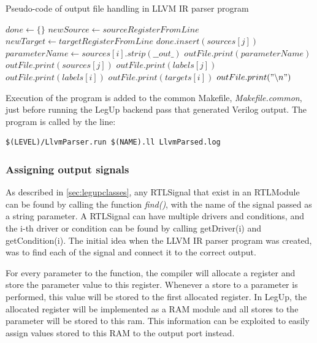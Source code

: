 \begin{algorithm}
  \caption{Pseudo-code of output file handling in LLVM IR parser program
  \label{alg:llvmparserpart2}}
  \begin{algorithmic}[1]
    \State $done \leftarrow \{\}$
            \State $newSource \leftarrow sourceRegisterFromLine$
            \State $newTarget \leftarrow targetRegisterFromLine$
            \State $done.insert(sources[j])$
              \State $parameterName \leftarrow sources[i].strip(\_\_out\_)$
              \State $outFile.print(parameterName)$
              \State $outFile.print(sources[j])$
              \State $outFile.print(labels[j])$
              \State $outFile.print(labels[i])$
              \State $outFile.print(targets[i])$
              \State $outFile.print("\backslash n")$ 
            \EndIf
          \EndIf
        \EndFor
      \EndFor
    \EndIf
  \end{algorithmic}
\end{algorithm}
Execution of the program is added to the common Makefile, \textit{Makefile.common}, just before running the LegUp backend pass that generated Verilog output. The program is called by the line:
\begin{verbatim}
$(LEVEL)/LlvmParser.run $(NAME).ll LlvmParsed.log
\end{verbatim}

\subsubsection{\label{subsec:assigningoutputsignals}Assigning output signals}
As described in \cref{sec:legupclasses}, any RTLSignal that exist in an RTLModule can be found by calling the function \textit{find()}, with the name of the signal passed as a string parameter. A RTLSignal can have multiple drivers and conditions, and the i-th driver or condition can be found by calling getDriver(i) and getCondition(i). The initial idea when the LLVM IR parser program was created, was to find each of the signal and connect it to the correct output.

For every parameter to the function, the compiler will allocate a register and store the parameter value to this register. Whenever a store to a parameter is performed, this value will be stored to the first allocated register. In LegUp, the allocated register will be implemented as a RAM module and all stores to the parameter will be stored to this ram. This information can be exploited to easily assign values stored to this RAM to the output port instead.

